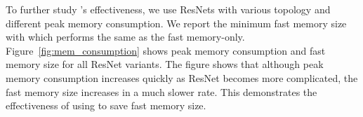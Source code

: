 To further study \name's effectiveness, we use ResNets with various topology and different peak memory consumption. We report the minimum fast memory size with which \name performs the same as the fast memory-only. %
Figure~\ref{fig:mem_consumption} shows peak memory consumption and fast memory size for all ResNet variants. The figure shows that although peak memory consumption increases quickly as ResNet becomes more complicated, the fast memory size increases in a much slower rate. This demonstrates the effectiveness of using \name to save fast memory size.

